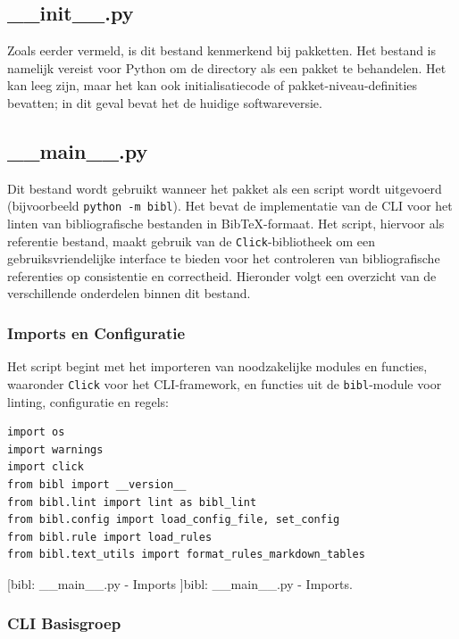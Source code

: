 \subsection{\_\_init\_\_.py}
Zoals eerder vermeld, is dit bestand kenmerkend bij pakketten. Het bestand is namelijk vereist voor Python om de directory als een pakket te behandelen. Het kan leeg zijn, maar het kan ook initialisatiecode of pakket-niveau-definities bevatten; in dit geval bevat het de huidige softwareversie.

\subsection{\_\_main\_\_.py}
Dit bestand wordt gebruikt wanneer het pakket als een script wordt uitgevoerd (bijvoorbeeld \texttt{python -m bibl}). Het bevat de implementatie van de \acrfull{CLI} voor het linten van bibliografische bestanden in BibTeX-formaat. Het script, hiervoor als referentie bestand, maakt gebruik van de \texttt{Click}-bibliotheek om een gebruiksvriendelijke interface te bieden voor het controleren van bibliografische referenties op consistentie en correctheid. Hieronder volgt een overzicht van de verschillende onderdelen binnen dit bestand.

\subsubsection{Imports en Configuratie}

Het script begint met het importeren van noodzakelijke modules en functies, waaronder \texttt{Click} voor het \acrshort{CLI}-framework, en functies uit de \texttt{bibl}-module voor linting, configuratie en regels:

\begin{verbatim}
import os
import warnings
import click
from bibl import __version__
from bibl.lint import lint as bibl_lint
from bibl.config import load_config_file, set_config
from bibl.rule import load_rules
from bibl.text_utils import format_rules_markdown_tables
\end{verbatim}
[bibl: \_\_main\_\_.py - Imports ]{bibl: \_\_main\_\_.py - Imports. \label{lst:bibl_main_imports}}

\subsubsection{\acrshort{CLI} Basisgroep}

